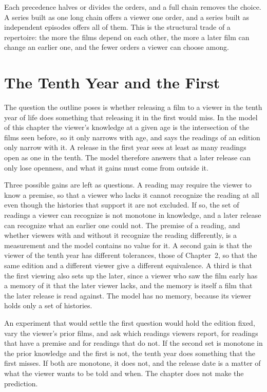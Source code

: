 \documentclass[11pt,twoside,openright]{book}
\theoremstyle{plain}
\theoremstyle{definition}
\theoremstyle{remark}
\begin{document}
Each precedence halves or divides the orders, and a full chain removes the choice. A series built as one long chain offers a viewer one order, and a series built as independent episodes offers all of them. This is the structural trade of a repertoire: the more the films depend on each other, the more a later film can change an earlier one, and the fewer orders a viewer can choose among.

\section{The Tenth Year and the First}\label{sec:tenth14}

The question the outline poses is whether releasing a film to a viewer in the tenth year of life does something that releasing it in the first would miss. In the model of this chapter the viewer's knowledge at a given age is the intersection of the films seen before, so it only narrows with age, and  says the readings of an edition only narrow with it. A release in the first year sees at least as many readings open as one in the tenth. The model therefore answers that a later release can only lose openness, and what it gains must come from outside it.

Three possible gains are left as questions. A reading may require the viewer to know a premise, so that a viewer who lacks it cannot recognize the reading at all even though the histories that support it are not excluded. If so, the set of readings a viewer can recognize is not monotone in knowledge, and a later release can recognize what an earlier one could not. The premise of a reading, and whether viewers with and without it recognize the reading differently, is a measurement and the model contains no value for it. A second gain is that the viewer of the tenth year has different tolerances, those of Chapter~2, so that the same edition and a different viewer give a different equivalence. A third is that the first viewing also sets up the later, since a viewer who saw the film early has a memory of it that the later viewer lacks, and the memory is itself a film that the later release is read against. The model has no memory, because its viewer holds only a set of histories.

An experiment that would settle the first question would hold the edition fixed, vary the viewer's prior films, and ask which readings viewers report, for readings that have a premise and for readings that do not. If the second set is monotone in the prior knowledge and the first is not, the tenth year does something that the first misses. If both are monotone, it does not, and the release date is a matter of what the viewer wants to be told and when. The chapter does not make the prediction.
\end{document}
